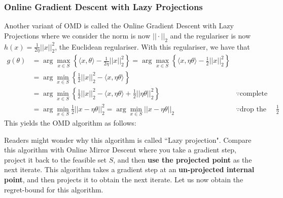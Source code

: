 \subsubsection{Online Gradient Descent with Lazy Projections}
Another variant of OMD is called the Online Gradient Descent with Lazy Projections \citep{zinkevich2003online} where we consider the norm is now $||\cdot||_2$ and the regulariser is now $h(x) =\frac{1}{2\eta}||x||_2^2$, the Euclidean regulariser. With this regulariser, we have that \begin{align*}
    g(\theta) &= \arg\max_{x \in S} \left\{\langle x, \theta\rangle - \frac{1}{2\eta}||x||_2^2\right\} = \arg\max_{x \in S} \left\{\langle x, \eta\theta\rangle - \frac{1}{2}||x||_2^2\right\} \\
    &= \arg\min_{x \in S} \left\{\frac{1}{2}||x||_2^2 - \langle x, \eta\theta\rangle\right\} \\
    &= \arg\min_{x \in S} \left\{\frac{1}{2}||x||_2^2 - \langle x, \eta\theta\rangle + \frac{1}{2}||\eta\theta||_2^2\right\} &\because \text{complete the square step}\\
    &= \arg\min_{x \in S} \frac{1}{2}||x - \eta\theta||_2^2 =\arg\min_{x \in S} ||x - \eta\theta||_2 &\because \text{drop the constant }\frac{1}{2}
\end{align*}
This yields the OMD algorithm as follows:
\begin{center}
\end{center}
Readers might wonder why this algorithm is called ``Lazy projection". Compare this algorithm with Online Mirror Descent where you take a gradient step, project it back to the feasible set $S$, and then \textbf{use the projected point} as the next iterate. This algorithm takes a gradient step at an \textbf{un-projected internal point}, and then projects it to obtain the next iterate. Let us now obtain the regret-bound for this algorithm. 
